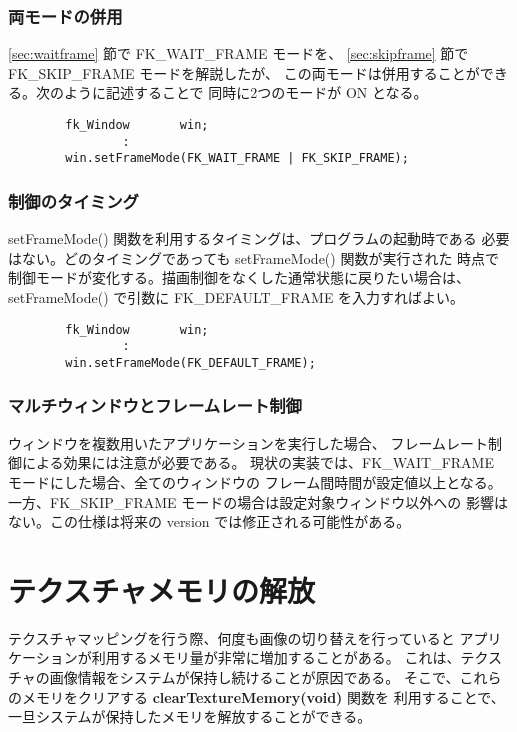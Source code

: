 \subsubsection*{両モードの併用}
\ref{sec:waitframe} 節で FK\_WAIT\_FRAME モードを、
\ref{sec:skipframe} 節で FK\_SKIP\_FRAME モードを解説したが、
この両モードは併用することができる。次のように記述することで
同時に2つのモードが ON となる。
\\
\begin{screen}
\begin{verbatim}
        fk_Window       win;
                :
        win.setFrameMode(FK_WAIT_FRAME | FK_SKIP_FRAME);
\end{verbatim}
\end{screen}

\subsubsection*{制御のタイミング}
setFrameMode() 関数を利用するタイミングは、プログラムの起動時である
必要はない。どのタイミングであっても setFrameMode() 関数が実行された
時点で制御モードが変化する。描画制御をなくした通常状態に戻りたい場合は、
setFrameMode() で引数に FK\_DEFAULT\_FRAME を入力すればよい。
\\
\begin{screen}
\begin{verbatim}
        fk_Window       win;
                :
        win.setFrameMode(FK_DEFAULT_FRAME);
\end{verbatim}
\end{screen}

\subsubsection*{マルチウィンドウとフレームレート制御}
ウィンドウを複数用いたアプリケーションを実行した場合、
フレームレート制御による効果には注意が必要である。
現状の実装では、FK\_WAIT\_FRAME モードにした場合、全てのウィンドウの
フレーム間時間が設定値以上となる。
一方、FK\_SKIP\_FRAME モードの場合は設定対象ウィンドウ以外への
影響はない。この仕様は将来の version では修正される可能性がある。

\section{テクスチャメモリの解放}
テクスチャマッピングを行う際、何度も画像の切り替えを行っていると
アプリケーションが利用するメモリ量が非常に増加することがある。
これは、テクスチャの画像情報をシステムが保持し続けることが原因である。
そこで、これらのメモリをクリアする \textbf{clearTextureMemory(void)} 関数を
利用することで、一旦システムが保持したメモリを解放することができる。

